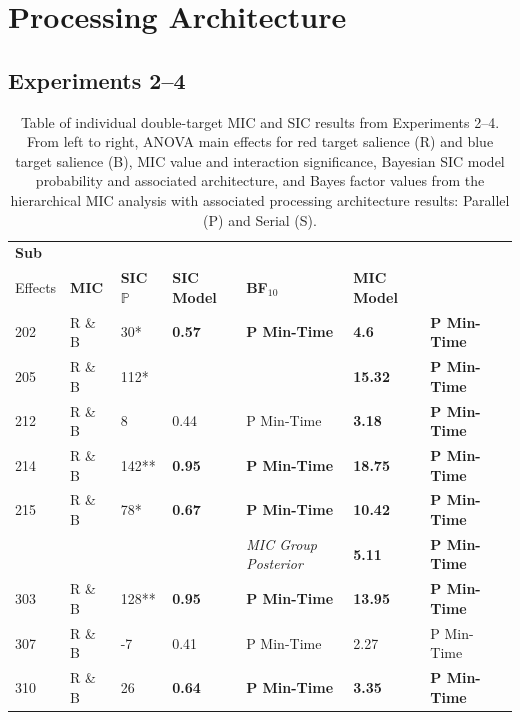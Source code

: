 \newpage
\section{Processing Architecture}
\label{Appendix: DT_Arch}
\subsection{Experiments 2--4}
\begin{table}[htb]
\caption{Table of individual double-target MIC and SIC results from Experiments 2--4. From left to right, ANOVA main effects for red target salience (R) and blue target salience (B), MIC value and interaction significance, Bayesian SIC model probability and associated architecture, and Bayes factor values from the hierarchical MIC analysis with associated processing architecture results: Parallel (P) and Serial (S).}
\centering 
\begin{tabular*}{\textwidth}{l @{\extracolsep{\fill}} lllllll}
\hhline{-------}
\textbf{Sub  } & \textbf{\begin{tabular}[c]{@{}c@{}}Main \\ Effects\end{tabular}} & \textbf{MIC} & \textbf{SIC} $\mathbb{P}$ & \textbf{SIC Model} & \textbf{BF$_{10}$} & \textbf{MIC Model} \\  
\hhline{-------}
202 & R \& B & 30*   &\textbf{0.57}& \textbf{P Min-Time}  & \textbf{4.6}  & \textbf{P Min-Time}\\
205 & R \& B & 112*  & &                                  & \textbf{15.32} & \textbf{P Min-Time}\\
212 & R \& B & 8     &0.44         & P Min-Time           & \textbf{3.18}  & \textbf{P Min-Time}\\
214 & R \& B & 142** &\textbf{0.95}& \textbf{P Min-Time}  & \textbf{18.75} & \textbf{P Min-Time}\\
215 & R \& B & 78* 	 &\textbf{0.67}& \textbf{P Min-Time}  & \textbf{10.42}  & \textbf{P Min-Time}\\
\hhline{~~~~---}
~&~&~&~& \textit{MIC Group Posterior}                              & \textbf{5.11}  & \textbf{P Min-Time} \\       
\hhline{-------}
303 & R \& B & 128** &\textbf{0.95}& \textbf{P Min-Time}  & \textbf{13.95} & \textbf{P Min-Time}\\ 
307 & R \& B & -7    &0.41& P Min-Time                    & 2.27 & P Min-Time\\      
310 & R \& B & 26    &\textbf{0.64}& \textbf{P Min-Time}  & \textbf{3.35} & \textbf{P Min-Time}\\      

\end{tabular*}
\end{table}
